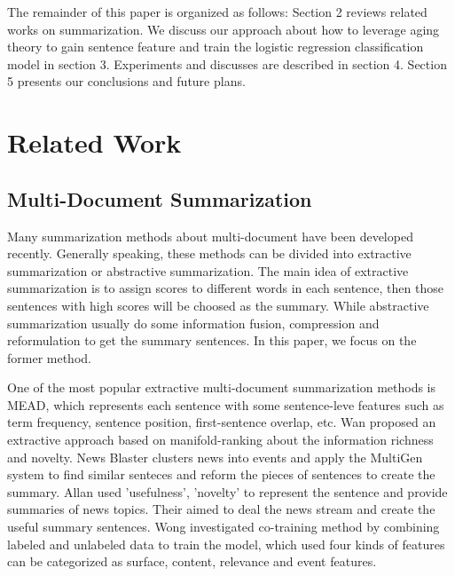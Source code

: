 \documentclass{acm_proc_article-sp}
\begin{document}
The remainder of this paper is organized as follows: Section 2 reviews related works on summarization. 
We discuss our approach about how to leverage aging theory to gain sentence feature and train the logistic regression classification model in section 3. 
Experiments and discusses are described in section 4. 
Section 5 presents our conclusions and future plans.


%
\section{Related Work}

\subsection{Multi-Document Summarization}

Many summarization methods about multi-document have been developed recently. 
Generally speaking, these methods can be divided into extractive summarization or abstractive summarization.
The main idea of extractive summarization is to assign scores to different words in each sentence, then those sentences with high scores will be choosed as the summary.
While abstractive summarization usually do some information fusion\cite{barzilay1999information}, compression\cite{2002-Knight-p91-107} and reformulation\cite{mckeown1999towards} to get the summary sentences.
In this paper, we focus on the former method.

One of the most popular extractive multi-document summarization methods is MEAD\cite{2004-Radev-p919-938}, which represents each sentence with some sentence-leve features such as term frequency, sentence position, first-sentence overlap, etc. 
Wan\cite{wan2007manifold} proposed an extractive approach based on manifold-ranking about the information richness and novelty.
News Blaster\cite{McKeown2003} clusters news into events and apply the MultiGen system to find similar senteces and reform the pieces of sentences to create the summary.
Allan\cite{2001-Allan-p10-18} used 'usefulness', 'novelty' to represent the sentence and provide summaries of news topics. Their aimed to deal the news stream and create the useful summary sentences.
Wong\cite{2008-Wong-p985-992} investigated co-training method by combining labeled and unlabeled data to train the model, which used four kinds of features can be categorized as surface, content, relevance and event features.
\end{document}
